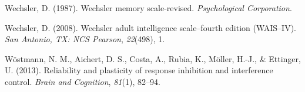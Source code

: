 \documentclass[
  man,floatsintext]{apa6}
\newlength{\cslhangindent}
\newlength{\cslentryspacingunit} %
\newenvironment{CSLReferences}[2] %
 {%
  \setlength{\parindent}{0pt}
  \ifodd #1
  \let\oldpar\par
  \def\par{\hangindent=\cslhangindent\oldpar}
  \fi
  \setlength{\parskip}{#2\cslentryspacingunit}
 }%
 {}
\begin{document}
\begin{CSLReferences}{1}{0}
\leavevmode{}%
Wechsler, D. (1987). Wechsler memory scale-revised. \emph{Psychological Corporation}.

\leavevmode{}%
Wechsler, D. (2008). Wechsler adult intelligence scale--fourth edition (WAIS--IV). \emph{San Antonio, TX: NCS Pearson}, \emph{22}(498), 1.

\leavevmode{}%
Wöstmann, N. M., Aichert, D. S., Costa, A., Rubia, K., Möller, H.-J., \& Ettinger, U. (2013). Reliability and plasticity of response inhibition and interference control. \emph{Brain and Cognition}, \emph{81}(1), 82--94.

\end{CSLReferences}
\end{document}
